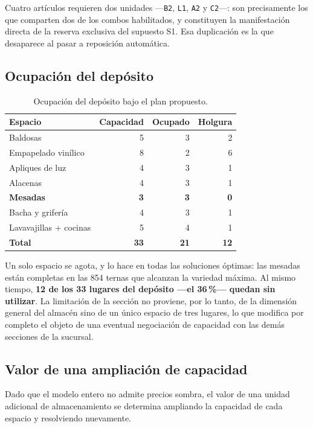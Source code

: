 \documentclass[10pt,a4paper]{article}
\newcommand{\cuello}[1]{\textbf{\textcolor{limita}{#1}}}
\newcommand{\art}[1]{\texttt{#1}}
\begin{document}
Cuatro artículos requieren dos unidades —\art{B2}, \art{L1}, \art{A2} y
\art{C2}—: son precisamente los que comparten dos de los combos habilitados, y
constituyen la manifestación directa de la reserva exclusiva del supuesto S1.
Esa duplicación es la que desaparece al pasar a reposición automática.

\subsection{Ocupación del depósito}

\begin{table}[H]
\centering\small
\caption{Ocupación del depósito bajo el plan propuesto.}
\label{tab:ocupacion_e1}
\begin{tabular}{lrrr}
\toprule
\textbf{Espacio} & \textbf{Capacidad} & \textbf{Ocupado} & \textbf{Holgura} \\
\midrule
Baldosas               & 5 & 3 & 2 \\
Empapelado vinílico    & 8 & 2 & 6 \\
Apliques de luz        & 4 & 3 & 1 \\
Alacenas               & 4 & 3 & 1 \\
\cuello{Mesadas}       & \cuello{3} & \cuello{3} & \cuello{0} \\
Bacha y grifería       & 4 & 3 & 1 \\
Lavavajillas + cocinas & 5 & 4 & 1 \\
\midrule
\textbf{Total} & \textbf{33} & \textbf{21} & \textbf{12} \\
\bottomrule
\end{tabular}
\end{table}

Un solo espacio se agota, y lo hace en todas las soluciones óptimas: las mesadas
están completas en las 854 ternas que alcanzan la variedad máxima. Al mismo
tiempo, \textbf{12 de los 33 lugares del depósito —el 36\,\%— quedan sin
utilizar}. La limitación de la sección no proviene, por lo tanto, de la
dimensión general del almacén sino de un único espacio de tres lugares, lo que
modifica por completo el objeto de una eventual negociación de capacidad con las
demás secciones de la sucursal.

\subsection{Valor de una ampliación de capacidad}
\label{sec:esc1_cap}

Dado que el modelo entero no admite precios sombra, el valor de una unidad
adicional de almacenamiento se determina ampliando la capacidad de cada espacio
y resolviendo nuevamente.
\end{document}
